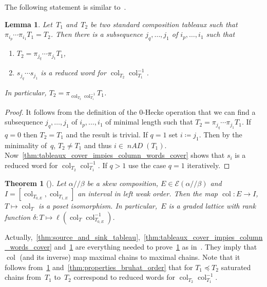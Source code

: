 \documentclass[10pt]{amsart}
\newtheorem{thm}{Theorem}[section]
\theoremstyle{plain}
\theoremstyle{plain}
\newtheorem{lemma}[lemma]{Lemma}
\theoremstyle{plain}
\theoremstyle{plain}
\theoremstyle{plain}
\theoremstyle{definition}
\theoremstyle{definition}
\newcommand{\mc}[1]{\mathcal{#1} }
\newcommand{\nAD}{\operatorname{\mathit{nAD}}}
\newcommand{\fs}{s}
\newcommand{\col}{\operatorname{col}}
\newcommand{\ab}{{\alpha / \! \! / \beta}}
\newcommand{\pleq}{\preceq}
\begin{document}
The following statement is similar to~\cite[Lemma~4.3]{Tewari2015}.
\begin{lemma}
	\label{thm:column_word_and_0-hecke_operation}
	Let~$T_1$ and~$T_2$ be two standard composition tableaux such that $\pi_{i_p} \cdots \pi_{i_1} T_1 = T_2$. Then there is a subsequence $j_q, \ldots, j_1$ of $i_p, \ldots,i_1$ such that
	\begin{enumerate}
		\item
		$T_2 = \pi_{j_q} \cdots \pi_{j_1}T_1$,
		\item 
		$\fs_{j_q} \cdots \fs_{j_1}$ is a reduced word for $\col_{T_2}\col^{-1}_{T_1}$.
	\end{enumerate}
	In particular, $T_2 = \pi_{\col_{T_2}\col^{-1}_{T_1}} T_1$.
\end{lemma}


\begin{proof} It follows from the definition of the 0-Hecke operation that we can find a subsequence $j_q, \ldots, j_1$ of $i_p, \ldots,i_1$ of minimal length such that $T_2 = \pi_{j_q} \cdots \pi_{j_1}T_1$. If~$q=0$ then $T_2 = T_1$ and the result is trivial. If $q=1$ set $i \coloneqq j_1$. Then by the minimality of~$q$, $T_2 \neq T_1$ and thus $i\in \nAD(T_1)$. Now~\cref{thm:tableaux_cover_impies_column_words_cover} shows that $\fs_i$ is a reduced word for $\col_{T_2}\col^{-1}_{T_1}$. If $q>1$ use the case $q=1$ iteratively.
\end{proof}



\begin{thm}[{\cite[Theorem~6.18]{Tewari2015}}]
	\label{thm:E_isomorphic_to_bruhat_interval}
	Let $\ab$ be a skew composition, $E\in \mc E(\ab)$ and $I = [\col_{T_{0,E}}, \col_{T_{1,E}}]$ an interval in left weak order. Then the map 
	$\col \colon E\to I$, $T\mapsto\col_T$ is a poset isomorphism. In particular,~$E$ is a graded lattice with rank function $\delta\colon T\mapsto \ell(\col_T \col^{-1}_{T_{0,E}})$.
\end{thm}

Actually,~\cref{thm:source_and_sink_tableau},~\cref{thm:tableaux_cover_impies_column_words_cover} and~\cref{thm:column_word_and_0-hecke_operation} are everything needed to prove~\cref{thm:E_isomorphic_to_bruhat_interval} as in~\cite{Tewari2015}. They imply that $\col$ (and its inverse) map maximal chains to maximal chains.
Note that it follows from~\cref{thm:E_isomorphic_to_bruhat_interval} and~\cref{thm:properties_bruhat_order} that for $T_1 \pleq T_2$ saturated chains from~$T_1$ to~$T_2$ correspond to reduced words for $\col_{T_2}\col^{-1}_{T_1}$.
\end{document}
